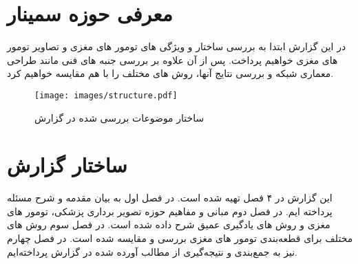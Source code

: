 \section{معرفی حوزه سمینار}
 در این گزارش ابتدا به بررسی ساختار و ویژگی های تومور های مغزی و تصاویر تومور های مغزی خواهیم پرداخت. پس از آن علاوه بر بررسی جنبه های فنی مانند طراحی معماری شبکه و بررسی نتایج آنها، روش های مختلف را با هم مقایسه خواهیم کرد.
\begin{figure}[ht]
\centerline{\texttt{[image: images/structure.pdf]}}
\caption{ساختار موضوعات بررسی شده در گزارش}
\label{fig:shir}
\end{figure}



\section{ساختار گزارش}
این گزارش در ۴ فصل تهیه شده است. در فصل اول به بیان مقدمه و شرح مسئله پرداخته ایم. در فصل دوم مبانی و مفاهیم حوزه تصویر برداری پزشکی، تومور های مغزی و روش های یادگیری عمیق شرح داده شده است. در فصل سوم روش های مختلف برای قطعه‌بندی تومور های مغزی بررسی و مقایسه شده است. در فصل چهارم نیز به جمع‌بندی و نتیجه‌گیری از مطالب آورده شده در گزارش پرداخته‌ایم.
